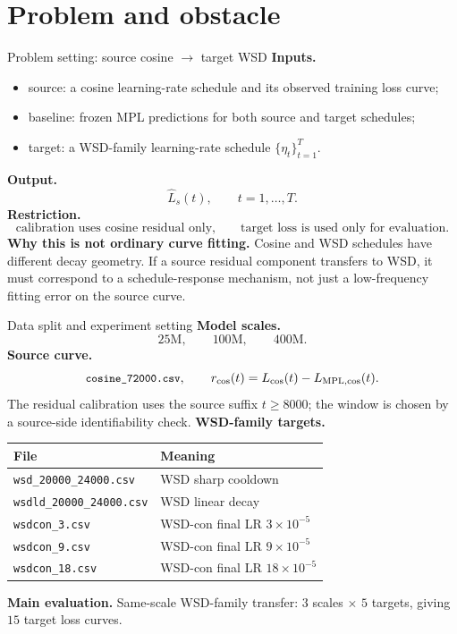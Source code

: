 \documentclass[9pt,aspectratio=169]{beamer}
\newcommand{\code}[1]{\texttt{\small #1}}
\newcommand{\tightlist}{\setlength{\itemsep}{2pt}\setlength{\parskip}{0pt}}
\begin{document}
\section{Problem and obstacle}

\begin{frame}{Problem setting: source cosine \(\rightarrow\) target WSD}
\small
\textbf{Inputs.}
\begin{itemize}\tightlist
\item source: a cosine learning-rate schedule and its observed training loss curve;
\item baseline: frozen MPL predictions for both source and target schedules;
\item target: a WSD-family learning-rate schedule \(\{\eta_t\}_{t=1}^T\).
\end{itemize}
\vfill
\textbf{Output.}
\[
\widehat L_s(t),\qquad t=1,\ldots,T.
\]
\vfill
\textbf{Restriction.}
\[
\text{calibration uses cosine residual only,}
\qquad
\text{target loss is used only for evaluation.}
\]
\vfill
\textbf{Why this is not ordinary curve fitting.}
Cosine and WSD schedules have different decay geometry.
If a source residual component transfers to WSD, it must correspond to a schedule-response mechanism,
not just a low-frequency fitting error on the source curve.
\end{frame}

\begin{frame}{Data split and experiment setting}
\footnotesize
\textbf{Model scales.}
\[
25\mathrm{M},\qquad 100\mathrm{M},\qquad 400\mathrm{M}.
\]
\vfill
\textbf{Source curve.}
\[
\code{cosine\_72000.csv},\qquad
r_{\cos}(t)=L_{\cos}(t)-L_{\mathrm{MPL},\cos}(t).
\]
The residual calibration uses the source suffix \(t\ge8000\);
the window is chosen by a source-side identifiability check.
\vfill
\textbf{WSD-family targets.}
\begin{center}\scriptsize
\begin{tabular}{ll}
\toprule
File & Meaning\\
\midrule
\code{wsd\_20000\_24000.csv} & WSD sharp cooldown\\
\code{wsdld\_20000\_24000.csv} & WSD linear decay\\
\code{wsdcon\_3.csv} & WSD-con final LR \(3\times10^{-5}\)\\
\code{wsdcon\_9.csv} & WSD-con final LR \(9\times10^{-5}\)\\
\code{wsdcon\_18.csv} & WSD-con final LR \(18\times10^{-5}\)\\
\bottomrule
\end{tabular}
\end{center}
\vfill
\textbf{Main evaluation.}
Same-scale WSD-family transfer:
\(3\) scales \(\times\) \(5\) targets, giving \(15\) target loss curves.
\end{frame}
\end{document}
